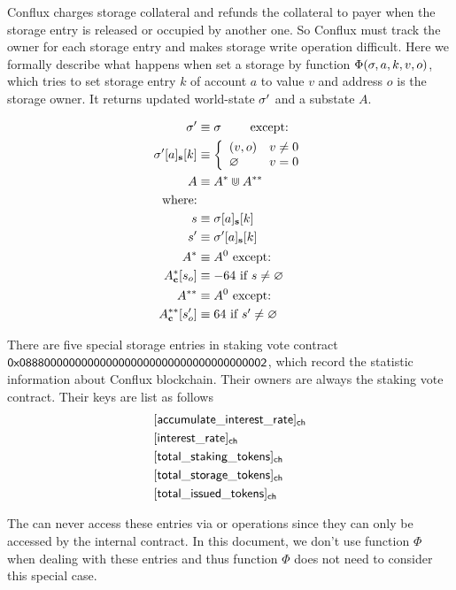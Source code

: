 \documentclass[fleqn,10pt]{SelfArx} %
\begin{document}
Conflux charges storage collateral and refunds the collateral to payer when the storage entry is released or occupied by another one. So Conflux must track the owner for each storage entry and makes storage write operation difficult. Here we formally describe what happens when set a storage by function $\Phi(\mathbf{\sigma},a,k,v,o)$, which tries to set storage entry $k$ of account $a$ to value $v$ and address $o$ is the storage owner. It returns updated world-state $\mathbf{\sigma}'$ and a substate $A$. 


\begin{align}
	\mathbf{\sigma}'   &\equiv \mathbf{\sigma} \qquad \mbox{  except:}\\ 
	\mathbf{\sigma}'[a]_{\bf s}[k] &\equiv\left\{
		\begin{array}{ll}
			(v,o) & v\neq 0\\
			\varnothing & v= 0\\
		\end{array}
	\right.\\
	A & \equiv A^{*} \Cup A^{**}\\
	\text{where:} & \\
	 s &\equiv \mathbf{\sigma}[a]_{\bf s}[k] \\
	 s' &\equiv \mathbf{\sigma}'[a]_{\bf s}[k]\\ 
	 A^{*} &\equiv A^0 \mbox{ except: } \\
	 A^{*}_{\bf c}[s_o]&\equiv -64 \mbox{ if $s\neq\varnothing$} \\
	 A^{**} &\equiv A^0 \mbox{ except:} \\
	 A^{**}_{\bf c}[s'_o]&\equiv 64 \mbox{ if $s'\neq\varnothing$} 
\end{align}

There are five special storage entries in staking vote contract ${\sf 0x0888000000000000000000000000000000000002}$, which record the statistic information about Conflux blockchain. Their owners are always the staking vote contract. Their keys are list as follows 
\begin{align}
	& \sf [accumulate\char`_interest\char`_rate]_{\sf ch} \\ 
	& \sf [interest\char`_rate]_{\sf ch} \\
    & \sf [total\char`_staking\char`_tokens]_{\sf ch} \\
    & \sf [total\char`_storage\char`_tokens]_{\sf ch} \\
    & \sf [total\char`_issued\char`_tokens]_{\sf ch} 
\end{align}

The \cvm can never access these entries via  or  operations since they can only be accessed by the internal contract. In this document, we don't use function $\Phi$ when dealing with these entries and thus function $\Phi$ does not need to consider this special case. 


\newpage


\newpage


\end{document}
